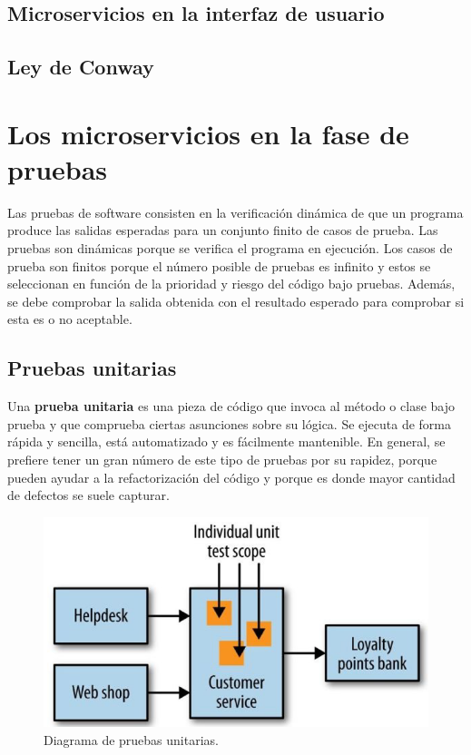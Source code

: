 \documentclass[11pt,spanish,listoffigures,listoftables]{tfgetsinf}
\begin{document}
\subsection{Microservicios en la interfaz de usuario}

\subsection{Ley de Conway}

\section{Los microservicios en la fase de pruebas}

Las pruebas de software consisten en la verificación dinámica de que un programa produce las salidas esperadas para un conjunto finito de casos de prueba. Las pruebas son dinámicas porque se verifica el programa en ejecución. Los casos de prueba son finitos porque el número posible de pruebas es infinito y estos se seleccionan en función de la prioridad y riesgo del código bajo pruebas. Además, se debe comprobar la salida obtenida con el resultado esperado para comprobar si esta es o no aceptable. \cite{Bourque2014}

\subsection{Pruebas unitarias}

Una \textbf{prueba unitaria} es una pieza de código que invoca al método o clase bajo prueba y que comprueba ciertas asunciones sobre su lógica. Se ejecuta de forma rápida y sencilla, está automatizado y es fácilmente mantenible. \cite{Osherove2014} En general, se prefiere tener un gran número de este tipo de pruebas por su rapidez, porque pueden ayudar a la refactorización del código y porque es donde mayor cantidad de defectos se suele capturar.

\begin{figure}[h]
\centering
\includegraphics[scale=0.5]{Unit_Tests}
\caption{Diagrama de pruebas unitarias.}
\end{figure}
\end{document}
